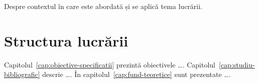 Despre contextul în care este abordată și se aplică tema lucrării.

\section{Structura lucrării}
Capitolul~\ref{cap:obiective-specificatii} prezintă obiectivele \dots. Capitolul~\ref{cap:studiu-bibliografic} descrie \dots. În capitolul~\ref{cap:fund-teoretice} sunt prezentate \dots.
